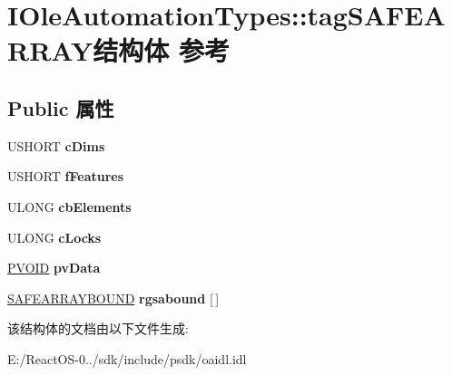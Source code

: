 \hypertarget{struct_i_ole_automation_types_1_1tag_s_a_f_e_a_r_r_a_y}{}\section{I\+Ole\+Automation\+Types\+:\+:tag\+S\+A\+F\+E\+A\+R\+R\+A\+Y结构体 参考}
\label{struct_i_ole_automation_types_1_1tag_s_a_f_e_a_r_r_a_y}
\subsection*{Public 属性}
\begin{DoxyCompactItemize}
\item 
\mbox{\label{struct_i_ole_automation_types_1_1tag_s_a_f_e_a_r_r_a_y_a7c30d0cf0f07170c7827a8cf092458b4}} 
U\+S\+H\+O\+RT {\bfseries c\+Dims}
\item 
\mbox{\label{struct_i_ole_automation_types_1_1tag_s_a_f_e_a_r_r_a_y_acc60757a8fde93ea1b94b27942cd5ba1}} 
U\+S\+H\+O\+RT {\bfseries f\+Features}
\item 
\mbox{\label{struct_i_ole_automation_types_1_1tag_s_a_f_e_a_r_r_a_y_ad4824a9b09185636fa1b27ed9171dd76}} 
U\+L\+O\+NG {\bfseries cb\+Elements}
\item 
\mbox{\label{struct_i_ole_automation_types_1_1tag_s_a_f_e_a_r_r_a_y_a2eff3eab5f67671f1483164a2cac7279}} 
U\+L\+O\+NG {\bfseries c\+Locks}
\item 
\mbox{\label{struct_i_ole_automation_types_1_1tag_s_a_f_e_a_r_r_a_y_a9e284af66f3c383ad9d845655ca7a876}} 
\hyperlink{interfacevoid}{P\+V\+O\+ID} {\bfseries pv\+Data}
\item 
\mbox{\label{struct_i_ole_automation_types_1_1tag_s_a_f_e_a_r_r_a_y_a509bf8c6d163120911aeecfe63c8c38f}} 
\hyperlink{struct_i_ole_automation_types_1_1tag_s_a_f_e_a_r_r_a_y_b_o_u_n_d}{S\+A\+F\+E\+A\+R\+R\+A\+Y\+B\+O\+U\+ND} {\bfseries rgsabound} \mbox{[}$\,$\mbox{]}
\end{DoxyCompactItemize}


该结构体的文档由以下文件生成\+:\begin{DoxyCompactItemize}
\item 
E\+:/\+React\+O\+S-\/0../sdk/include/psdk/oaidl.\+idl\end{DoxyCompactItemize}
